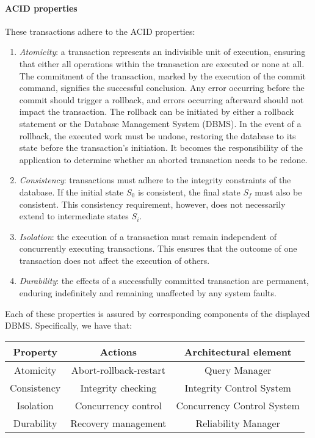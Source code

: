 \paragraph*{ACID properties}
These transactions adhere to the ACID properties:
\begin{enumerate}
    \item \textit{Atomicity}: a transaction represents an indivisible unit of execution, ensuring that either all operations within the transaction are executed or none at all.
        The commitment of the transaction, marked by the execution of the commit command, signifies the successful conclusion. 
        Any error occurring before the commit should trigger a rollback, and errors occurring afterward should not impact the transaction.        
        The rollback can be initiated by either a rollback statement or the Database Management System (DBMS).
        In the event of a rollback, the executed work must be undone, restoring the database to its state before the transaction's initiation.
        It becomes the responsibility of the application to determine whether an aborted transaction needs to be redone.
    \item \textit{Consistency}: transactions must adhere to the integrity constraints of the database.
        If the initial state $S_0$ is consistent, the final state $S_f$ must also be consistent. 
        This consistency requirement, however, does not necessarily extend to intermediate states $S_i$.
    \item \textit{Isolation}: the execution of a transaction must remain independent of concurrently executing transactions. 
        This ensures that the outcome of one transaction does not affect the execution of others.
    \item \textit{Durability}: the effects of a successfully committed transaction are permanent, enduring indefinitely and remaining unaffected by any system faults.
\end{enumerate}
Each of these properties is assured by corresponding components of the displayed DBMS. 
Specifically, we have that:
\begin{table}[H]
    \centering
    \begin{tabular}{c|c|c}
    \textbf{Property} & \textbf{Actions}       & \textbf{Architectural element} \\ \hline
    Atomicity         & Abort-rollback-restart & Query Manager                  \\
    Consistency       & Integrity checking     & Integrity Control System       \\
    Isolation         & Concurrency control    & Concurrency Control System     \\
    Durability        & Recovery management    & Reliability Manager           
    \end{tabular}
\end{table}